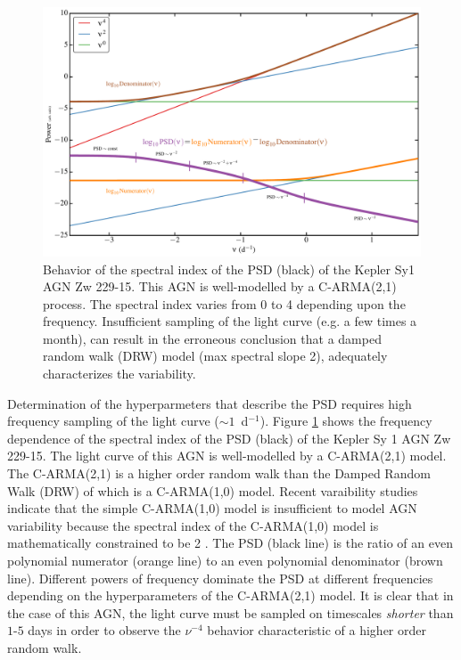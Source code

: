 \begin{figure}
\includegraphics[width=5.0in]{figs/agn/AGN_Variability_01.pdf}
\caption{Behavior of the spectral index of the PSD (black) of the Kepler Sy1 
AGN Zw 229-15. This AGN is well-modelled by a C-ARMA(2,1) process. The spectral index varies
from 0 to 4 depending upon the frequency. Insufficient sampling of the light
curve (e.g. a few times a month), can result in the erroneous conclusion that a 
damped random walk (DRW) model (max spectral slope 2), adequately 
characterizes the variability.
}
\label{PSDvsFreq}
\end{figure}

Determination of the hyperparmeters that describe the PSD requires high frequency
sampling of the light curve ($\sim 1$~d$^{-1}$). Figure \ref{PSDvsFreq} shows
the frequency dependence of the spectral index of the PSD (black) of the Kepler Sy 1 AGN 
Zw 229-15. The light curve of this AGN is well-modelled by a C-ARMA(2,1) 
model. The C-ARMA(2,1) is a higher order random walk than the 
Damped Random Walk (DRW) of \citet{Kelly09} which is a C-ARMA(1,0)
 model. Recent varaibility studies indicate that the simple C-ARMA(1,0) 
model is insufficient to model AGN variability because the spectral
 index of the C-ARMA(1,0)
model is mathematically constrained to be 2 \citep{Kelly14,Kasliwal15,Simm15}. 
The PSD (black line) is the ratio of an even polynomial numerator (orange line) to 
an even polynomial denominator (brown line). Different powers of frequency dominate
the PSD at different frequencies depending on the hyperparameters of the C-ARMA(2,1) model. It is
clear that in the case of this AGN, the light curve must be sampled on timescales {\em shorter} than 
$1$-$5$ days in order to observe the $\nu^{-4}$ behavior characteristic of a higher order random walk.

